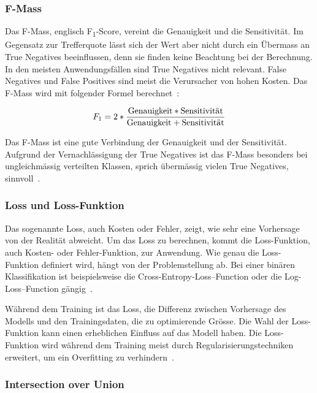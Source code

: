 \subsubsection{F-Mass}
\label{chap:f1-score}

Das F-Mass, englisch F\textsubscript{1}-Score, vereint die Genauigkeit und die Sensitivität. Im Gegensatz zur Trefferquote lässt sich der Wert aber nicht durch ein Übermass an True Negatives beeinflussen, denn sie finden keine Beachtung bei der Berechnung. In den meisten Anwendungsfällen sind True Negatives nicht relevant. False Negatives und False Positives sind meist die Verursacher von hohen Kosten. Das F-Mass wird mit folgender Formel berechnet~\autocite{TDSAccuracy}:

\nopagebreak

$$F_1=2 * \frac{\textnormal{Genauigkeit} * \textnormal{Sensitivität}}{\textnormal{Genauigkeit} + \textnormal{Sensitivität}}$$
\vspace*{0.2cm}

Das F-Mass ist eine gute Verbindung der Genauigkeit und der Sensitivität. Aufgrund der Vernachlässigung der True Negatives ist das F-Mass besonders bei ungleichmässig verteilten Klassen, sprich übermässig vielen True Negatives, sinnvoll~\autocite{TDSAccuracy}.

\subsubsection{Loss und Loss-Funktion}

Das sogenannte Loss, auch Kosten oder Fehler, zeigt, wie sehr eine Vorhersage von der Realität abweicht. Um das Loss zu berechnen, kommt die Loss-Funktion, auch Kosten- oder Fehler-Funktion, zur Anwendung. Wie genau die Loss-Funktion definiert wird, hängt von der Problemstellung ab. Bei einer binären Klassifikation ist beispielsweise die Cross-Entropy-Loss–Function oder die Log-Loss–Function gängig~\autocite{TDSLoss}. 

Während dem Training ist das Loss, die Differenz zwischen Vorhersage des Modells und den Trainingsdaten, die zu optimierende Grösse. Die Wahl der Loss-Funktion kann einen erheblichen Einfluss auf das Modell haben. Die Loss-Funktion wird während dem Training meist durch Regularisierungstechniken erweitert, um ein Overfitting zu verhindern~\autocite{Goodfellow2016}.

\subsubsection{Intersection over Union}

